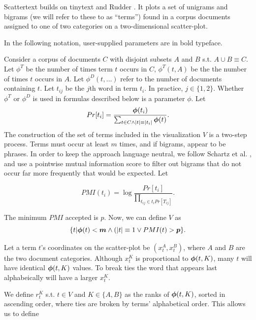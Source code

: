 \documentclass[11pt]{article}
\begin{document}
Scattertext builds on tinytext and Rudder .  It plots a set of unigrams and bigrams (we will refer to these to as ``terms'') found in a corpus documents assigned to one of two categories on a two-dimensional scatter-plot.  

In the following notation, user-supplied parameters are in bold typeface. 

Consider a corpus of documents $C$ with disjoint subsets $A$ and $B$ s.t. $A \cup B \equiv C$. Let $\phi^T$ be the number of times term $t$ occurs in $C$, $\phi^{T}(t,A)$ be the the number of times $t$ occurs in $A$. Let $\phi^{D}(t,\ldots)$ refer to the number of documents containing $t$.  Let $t_{ij}$ be the $j$th word in term $t_i$.  In practice, $j \in \{1,2\}$.   Whether $\phi^T$ or $\phi^D$ is used in formulas described below is a parameter \mbox{\boldmath$\phi$}.  Let
\vspace{-.2cm}
$$Pr[t_i] = \frac{\mbox{\boldmath$\phi$}(t_i)}{\sum_{t \in C\wedge|t|\equiv|t_i|} \mbox{\boldmath$\phi$}(t)}.$$
\vspace{-.2cm}
The construction of the set of terms included in the visualization $V$ is a two-step process. Terms must occur at least \mbox{\boldmath$m$} times, and if bigrams, appear to be phrases.  In order to keep the approach language neutral, we follow Schartz et al. , and use a pointwise mutual information score to filter out bigrams that do not occur far more frequently that would be expected.  Let

\vspace{-.2cm}
$$PMI(t_i) = \log \frac{Pr[t_i]}{\prod_{t_{ij}\in t_i{Pr[T_{ij}]}}}.$$
\vspace{-.2cm}

The minimum $PMI$ accepted is \mbox{\boldmath$p$}. Now, we can define $V$ as 
\vspace{-.2cm}
$$\{t|\mbox{\boldmath$\phi$}(t)<\mbox{\boldmath$m$} \wedge (|t| \equiv 1 \vee PMI(t) > \mbox{\boldmath$p$}\}.$$
\vspace{-.2cm}

Let a term $t$'s coordinates on the scatter-plot be $(x^{A}_{t}, x^{B}_t)$, where $A$ and $B$ are the two document categories. Although $x^{K}_t$ is proportional to $\mbox{\boldmath$\phi$}(t,K)$, many $t$ will have identical $\mbox{\boldmath$\phi$}(t,K)$ values.  To break ties the word that appears last alphabeically will have a larger $x^{K}_t$.

We define $r^{K}_t$ s.t. $t \in V$ and $K \in \{A,B\}$ as the ranks of $\mbox{\boldmath$\phi$}(t,K)$, sorted in ascending order, where ties are broken by terms' alphabetical order.  This allows us to define 
\end{document}
